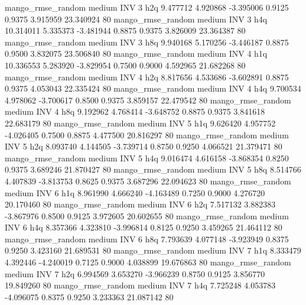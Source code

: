 mango_rmse_random     medium      INV                 3                  h2q  9.477712 4.920868 -3.395006 0.9125 0.9375  3.915959   23.340924 80
mango_rmse_random     medium      INV                 3                  h4q 10.314011 5.335373 -3.481944 0.8875 0.9375  3.826009   23.364387 80
mango_rmse_random     medium      INV                 3                  h8q  9.940168 5.170256 -3.446187 0.8875 0.9500  3.832075   23.506840 80
mango_rmse_random     medium      INV                 4                  h1q 10.336553 5.283920 -3.829954 0.7500 0.9000  4.592965   21.682268 80
mango_rmse_random     medium      INV                 4                  h2q  8.817656 4.533686 -3.602891 0.8875 0.9375  4.053043   22.335424 80
mango_rmse_random     medium      INV                 4                  h4q  9.700534 4.978062 -3.700617 0.8500 0.9375  3.859157   22.479542 80
mango_rmse_random     medium      INV                 4                  h8q  9.192962 4.768414 -3.648752 0.8875 0.9375  3.841618   22.683179 80
mango_rmse_random     medium      INV                 5                  h1q  9.626420 4.957752 -4.026405 0.7500 0.8875  4.477500   20.816297 80
mango_rmse_random     medium      INV                 5                  h2q  8.093740 4.144505 -3.739714 0.8750 0.9250  4.066521   21.379471 80
mango_rmse_random     medium      INV                 5                  h4q  9.016474 4.616158 -3.868354 0.8250 0.9375  3.689246   21.870427 80
mango_rmse_random     medium      INV                 5                  h8q  8.514766 4.407839 -3.813753 0.8625 0.9375  3.687296   22.094623 80
mango_rmse_random     medium      INV                 6                  h1q  8.961990 4.666240 -4.163489 0.7250 0.9000  4.276720   20.170460 80
mango_rmse_random     medium      INV                 6                  h2q  7.517132 3.882383 -3.867976 0.8500 0.9125  3.972605   20.602655 80
mango_rmse_random     medium      INV                 6                  h4q  8.357366 4.323810 -3.996814 0.8125 0.9250  3.459265   21.464112 80
mango_rmse_random     medium      INV                 6                  h8q  7.793639 4.077148 -3.923949 0.8375 0.9250  3.423160   21.689531 80
mango_rmse_random     medium      INV                 7                  h1q  8.333479 4.392446 -4.240019 0.7125 0.9000  4.038899   19.676863 80
mango_rmse_random     medium      INV                 7                  h2q  6.994569 3.653270 -3.966239 0.8750 0.9125  3.856770   19.849260 80
mango_rmse_random     medium      INV                 7                  h4q  7.725248 4.053783 -4.096075 0.8375 0.9250  3.233363   21.087142 80
